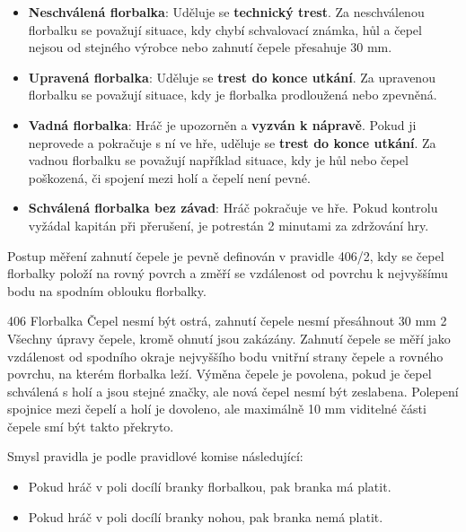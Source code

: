 \documentclass{newsletter}
\begin{document}
\begin{itemize}
	\item \textbf{Neschválená florbalka}: Uděluje se \textcolor{cfred}{\textbf{technický trest}}. Za neschválenou florbalku se považují situace, kdy chybí schvalovací známka, hůl a čepel nejsou od stejného výrobce nebo zahnutí čepele přesahuje 30 mm.
	\item \textbf{Upravená florbalka}: Uděluje se \textcolor{cfred}{\textbf{trest do konce utkání}}. Za upravenou florbalku se považují situace, kdy je florbalka prodloužená nebo zpevněná.
	\item \textbf{Vadná florbalka}: Hráč je upozorněn a \textbf{vyzván k nápravě}. Pokud ji neprovede a pokračuje s ní ve hře, uděluje se \textcolor{cfred}{\textbf{trest do konce utkání}}. Za vadnou florbalku se považují například situace, kdy je hůl nebo čepel poškozená, či spojení mezi holí a čepelí není pevné.
	\item \textbf{Schválená florbalka bez závad}: Hráč pokračuje ve hře. Pokud kontrolu vyžádal kapitán při přerušení, je potrestán 2 minutami za zdržování hry.
\end{itemize}

Postup měření zahnutí čepele je pevně definován v pravidle 406/2, kdy se čepel florbalky položí na rovný povrch a změří se vzdálenost od povrchu k nejvyššímu bodu na spodním oblouku florbalky.

\begin{pravidlo}
	{406 Florbalka}
	{Čepel nesmí být ostrá, zahnutí čepele nesmí přesáhnout 30 mm}
	{2} Všechny úpravy čepele, kromě ohnutí jsou zakázány. \textcolor{cfred}{Zahnutí čepele se měří jako vzdálenost od spodního okraje nejvyššího bodu vnitřní strany čepele a rovného povrchu, na kterém florbalka leží}. Výměna čepele je povolena, pokud je čepel schválená s holí a jsou stejné značky, ale nová čepel nesmí být zeslabena. Polepení spojnice mezi čepelí a holí je dovoleno, ale maximálně 10 mm viditelné části čepele smí být takto překryto.
\end{pravidlo}


\clearpage
{}

\clearpage
{}

Smysl pravidla je podle pravidlové komise následující:

\begin{itemize}
	\item Pokud hráč v poli docílí branky florbalkou, pak branka má platit.
	\item Pokud hráč v poli docílí branky nohou, pak branka nemá platit.
\end{itemize}
\end{document}
